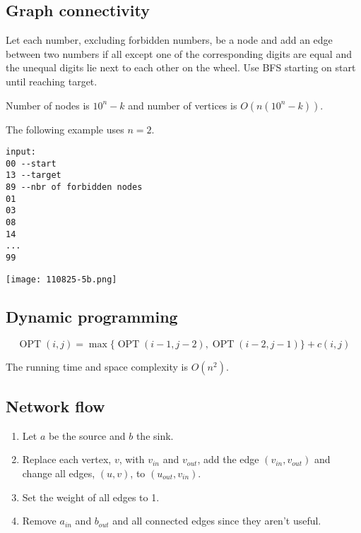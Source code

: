 \documentclass[a4paper]{article}
\newenvironment{task}[1]
{
	\begin{description}[align=right]
		\item [#1]
}{		%
	\end{description}
}
\DeclareMathOperator{\OPT}{OPT}
\DeclareMathOperator{\*}{\cdot}
\begin{document}
\subsection*{Graph connectivity}

\begin{task}{5. (a)}
\end{task}

\pagebreak
\begin{task}{(b)}
	\qquad Let each number, excluding forbidden numbers, be a node and add an edge between two numbers if all except one of the corresponding digits are equal and the unequal digits lie next to each other on the wheel. Use BFS starting on start until reaching target.
	
	Number of nodes is $10^n-k$ and number of vertices is $O(n(10^n-k))$.
	
	The following example uses $n=2$.
	
\begin{lstlisting}
input:
00 --start
13 --target
89 --nbr of forbidden nodes
01
03
08
14
...
99
\end{lstlisting}
	
	\texttt{[image: 110825-5b.png]}
\end{task}

\subsection*{Dynamic programming}

\begin{task}{6. (a)}
\end{task}

\begin{task}{(b)}
	\[\OPT(i,j)=\max\{\OPT(i-1,j-2), \OPT(i-2,j-1)\}+c(i,j)\]
\end{task}

\begin{task}{(c)}
	\qquad The running time and space complexity is $O(n^2)$.
\end{task}

\subsection*{Network flow}

\begin{task}{7. (a)}
\end{task}

\begin{task}{(b)}
	\qquad 
	\begin{enumerate}
		\item Let $a$ be the source and $b$ the sink.
		\item Replace each vertex, $v$, with $v_{in}$ and $v_{out}$, add the edge $(v_{in},v_{out})$ and change all edges, $(u,v)$, to $(u_{out},v_{in})$.
		\item Set the weight of all edges to 1.
		\item Remove $a_{in}$ and $b_{out}$ and all connected edges since they aren't useful.
	\end{enumerate} 
\end{task}
\end{document}
